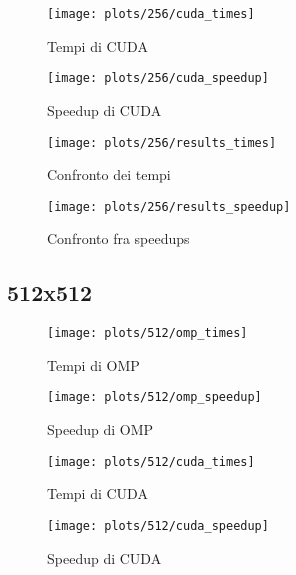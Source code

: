 \begin{figure}[H]
    \centering
    \begin{minipage}{0.49\textwidth}
        \centering
        \texttt{[image: plots/256/cuda\_times]}
        \caption{Tempi di CUDA}\label{fig:times-256-cuda}
    \end{minipage}
    \begin{minipage}{0.49\textwidth}
        \centering
        \texttt{[image: plots/256/cuda\_speedup]}
        \caption{Speedup di CUDA}\label{fig:speedup-256-cuda}
    \end{minipage}
\end{figure}

\begin{figure}[H]
    \centering
    \begin{minipage}{0.49\textwidth}
        \centering
        \texttt{[image: plots/256/results\_times]}
        \caption{Confronto dei tempi}\label{fig:tempi-256}
    \end{minipage}
    \begin{minipage}{0.49\textwidth}
        \centering
        \texttt{[image: plots/256/results\_speedup]}
        \caption{Confronto fra speedups}\label{fig:speedups-256}
    \end{minipage}
\end{figure}

\subsection{512x512}\label{subsec:512x512}
\begin{figure}[H]
    \centering
    \begin{minipage}{0.49\textwidth}
        \centering
        \texttt{[image: plots/512/omp\_times]}
        \caption{Tempi di OMP}\label{fig:times-512-omp}
    \end{minipage}
    \begin{minipage}{0.49\textwidth}
        \centering
        \texttt{[image: plots/512/omp\_speedup]}
        \caption{Speedup di OMP}\label{fig:speedup-512-omp}
    \end{minipage}
\end{figure}

\begin{figure}[H]
    \centering
    \begin{minipage}{0.49\textwidth}
        \centering
        \texttt{[image: plots/512/cuda\_times]}
        \caption{Tempi di CUDA}\label{fig:times-512-cuda}
    \end{minipage}
    \begin{minipage}{0.49\textwidth}
        \centering
        \texttt{[image: plots/512/cuda\_speedup]}
        \caption{Speedup di CUDA}\label{fig:speedup-512-cuda}
    \end{minipage}
\end{figure}

